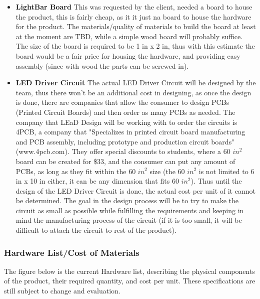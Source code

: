 \documentclass[12pt]{article}
\begin{document}
{{\begin{itemize}
				\item \textbf{LightBar Board}
				This was requested by the client, needed a board to house the product, this is fairly cheap, as it it just na board to house the hardware for the product. The materials/quality of materials to build the board at least at the moment are TBD, while a simple wood board will probably suffice. The size of the board is required to be 1 in x 2 in, thus with this estimate the board would be a fair price for housing the hardware, and providing easy assembly (since with wood the parts can be screwed in).	
				\item \textbf{LED Driver Circuit}
				The actual LED Driver Circuit will be designed by the team, thus there won't be an additional cost in designing, as once the design is done, there are companies that allow the consumer to design PCBs (Printed Circuit Boards) and then order as many PCBs as needed. The company that LEaD Design will be working with to order the circuits is 4PCB, a company that "Specializes in printed circuit board manufacturing and PCB assembly, including prototype and production circuit boards" (www.4pcb.com). They offer special discounts to students, where a 60 $in^2$ board can be created for \$33, and the consumer can put any amount of PCBs, as long as they fit within the 60 $in^2$ size (the 60 $in^2$ is not limited to 6 in x 10 in either, it can be any dimension that fits 60 $in^2$). Thus until the design of the LED Driver Circuit is done, the actual cost per unit of it cannot be determined. The goal in the design process will be to try to make the circuit as small as possible while fulfilling the requirements and keeping in mind the manufacturing process of the circuit (if it is too small, it will be difficult to attach the circuit to rest of the product).
			\end{itemize}
			
			\subsubsection{Hardware List/Cost of Materials}
			The figure below is the current Hardware list, describing the physical components of the product, their required quantity, and cost per unit. These specifications are still subject to change and evaluation.
			
}}
\end{document}
